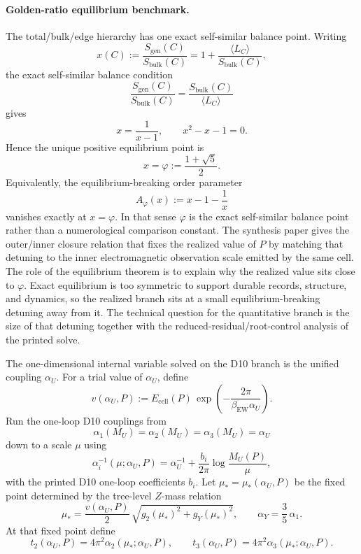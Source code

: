 \documentclass[11pt]{article}
\begin{document}
\paragraph{Golden-ratio equilibrium benchmark.}
The total/bulk/edge hierarchy has one exact self-similar balance point. Writing
\[
x(C):=\frac{S_{\mathrm{gen}}(C)}{S_{\mathrm{bulk}}(C)}
=
1+\frac{\langle L_C\rangle}{S_{\mathrm{bulk}}(C)},
\]
the exact self-similar balance condition
\[
\frac{S_{\mathrm{gen}}(C)}{S_{\mathrm{bulk}}(C)}
=
\frac{S_{\mathrm{bulk}}(C)}{\langle L_C\rangle}
\]
gives
\[
x=\frac{1}{x-1},
\qquad
x^2-x-1=0.
\]
Hence the unique positive equilibrium point is
\[
x=\varphi:=\frac{1+\sqrt5}{2}.
\]
Equivalently, the equilibrium-breaking order parameter
\[
A_\varphi(x):=x-1-\frac1x
\]
vanishes exactly at \(x=\varphi\). In that sense \(\varphi\) is the exact self-similar balance
point rather than a numerological comparison constant. The synthesis paper gives the outer/inner
closure relation that fixes the realized value of \(P\) by matching that detuning to the inner
electromagnetic observation scale emitted by the same cell. The role of the equilibrium theorem is
to explain why the realized value sits close to \(\varphi\). Exact equilibrium is too symmetric to
support durable records, structure, and dynamics, so the realized branch sits at a small
equilibrium-breaking detuning away from it. The technical question for the quantitative branch is
the size of that detuning together with the reduced-residual/root-control analysis of the printed
solve.

The one-dimensional internal variable solved on the D10 branch is the unified coupling \(\alpha_U\). For a trial value of \(\alpha_U\), define
\[
v(\alpha_U,P)
:=
E_{\mathrm{cell}}(P)\,
\exp\!\left(-\frac{2\pi}{\beta_{\mathrm{EW}}\alpha_U}\right).
\]
Run the one-loop D10 couplings from
\[
\alpha_1(M_U)=\alpha_2(M_U)=\alpha_3(M_U)=\alpha_U
\]
down to a scale \(\mu\) using
\[
\alpha_i^{-1}(\mu;\alpha_U,P)
=
\alpha_U^{-1}
+
\frac{b_i}{2\pi}\log\frac{M_U(P)}{\mu},
\]
with the printed D10 one-loop coefficients \(b_i\). Let \(\mu_\ast=\mu_\ast(\alpha_U,P)\) be the fixed point determined by the tree-level \(Z\)-mass relation
\[
\mu_\ast
=
\frac{v(\alpha_U,P)}{2}\,
\sqrt{g_2(\mu_\ast)^2+g_Y(\mu_\ast)^2},
\qquad
\alpha_Y=\frac35\,\alpha_1.
\]
At that fixed point define
\[
t_2(\alpha_U,P)=4\pi^2\alpha_2(\mu_\ast;\alpha_U,P),
\qquad
t_3(\alpha_U,P)=4\pi^2\alpha_3(\mu_\ast;\alpha_U,P).
\]
\end{document}
